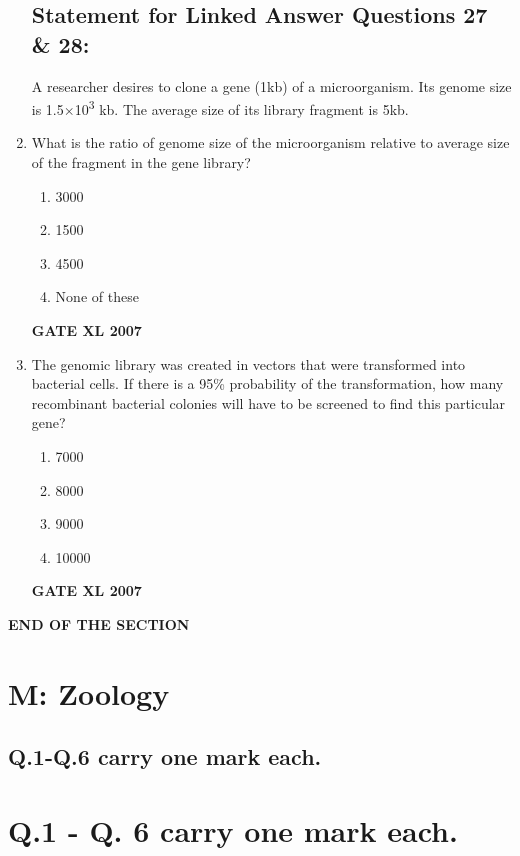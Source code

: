 \documentclass[journal,12pt,onecolumn]{IEEEtran}
\begin{document}
\begin{enumerate}
\vspace{2em}

\subsection*{Statement for Linked Answer Questions 27 \& 28:}
A researcher desires to clone a gene (1kb) of a microorganism. Its genome size is 1.5$\times$10\textsuperscript{3} kb. The average size of its library fragment is 5kb.

\item What is the ratio of genome size of the microorganism relative to average size of the fragment in the gene library?
\begin{enumerate}
    \item 3000
    \item 1500
    \item 4500
    \item None of these
\end{enumerate}\hfill{\textbf{GATE XL 2007}}

\item The genomic library was created in vectors that were transformed into bacterial cells. If there is a 95\% probability of the transformation, how many recombinant bacterial colonies will have to be screened to find this particular gene?
\begin{enumerate}
    \item 7000
    \item 8000
    \item 9000
    \item 10000
\end{enumerate}\hfill{\textbf{GATE XL 2007}}
\end{enumerate}

\begin{center}
\textbf{END OF THE SECTION}
\end{center}

\newpage

\section*{M: Zoology}
\subsection*{Q.1-Q.6 carry one mark each.}

\section*{Q.1 - Q. 6 carry one mark each.}
\end{document}
